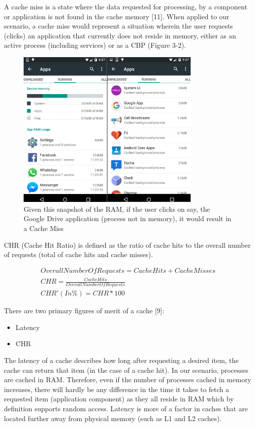 \documentclass[12pt]{uthesis-v12}  %
\begin{document}
			A cache miss is a state where the data requested for processing, by a component or application is not found in the cache memory [11]. When applied to our scenario, a cache miss would represent a situation wherein the user requests (clicks) an application that currently does not reside in memory, either as an active process (including services) or as a CBP (Figure 3-2).
			
			\begin{figure}[!ht]
				\centering
				\includegraphics[width = 90mm]{images/runningApps.png}
				\caption[Running Apps and CBP(s) - Cache Miss]
				{Given this snapshot of the RAM, if the user clicks on say, the Google Drive application (process not in memory), it would result in a Cache Miss}
			\end{figure}		
			
			CHR (Cache Hit Ratio) is defined as the ratio of cache hits to the overall number of requests (total of cache hits and cache misses).
			
			\begin{eqnarray}
				Overall Number Of Requests = Cache Hits + Cache Misses \label{Total Requests} \\
				CHR = \frac{Cache Hits}{Overall Number Of Requests} \label{CHR} \\
				CHR'(In \%) = CHR * 100 
			\end{eqnarray}
			
			There are two primary figures of merit of a cache [9]:
			
			\begin{itemize}
				\item Latency
				\item CHR
			\end{itemize}
			
			The latency of a cache describes how long after requesting a desired item, the cache can return that item (in the case of a cache hit). In our scenario, processes are cached in RAM. Therefore, even if the number of processes cached in memory increases, there will hardly be any difference in the time it takes to fetch a requested item (application component) as they all reside in RAM which by definition supports random access. Latency is more of a factor in caches that are located further away from physical memory (such as L1 and L2 caches).
			
\end{document}
